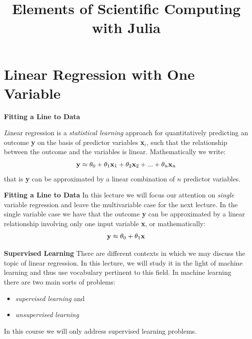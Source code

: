 \documentclass[xcolor=dvipsnames]{beamer}
\title[Scientific Computing]{Elements of Scientific Computing with Julia}
\begin{document}
\begin{frame}
\titlepage
\end{frame}

\section{Linear Regression with One Variable}
\begin{frame}
{\bf Fitting a Line to Data}

{\it\huge L}inear regression is a \emph{statistical learning} approach for quantitatively predicting an outcome {\bf y} on the basis of predictor variables {\bf x}$_i$, such that the relationship between the outcome and the variables is linear. Mathematically we write: \pause
\[
\textnormal{{\bf y}} \approx  \theta_0 +
\theta_1 \textnormal{{\bf x}}_1 +
\theta_2 \textnormal{{\bf x}}_2 + ... +
\theta_n \textnormal{{\bf x}}_n
\]
\pause
that is {\bf y} can be approximated by a linear combination of $n$ predictor variables.\\
\end{frame}

\begin{frame}
{\bf Fitting a Line to Data}
In this lecture we will focus our attention on \emph{single} variable regression and leave the multivariable case for the next lecture. In the single variable case we have that the outcome {\bf y} can be approximated by a linear relationship involving only one input variable {\bf x}, or mathematically: \pause
\[
\textnormal{{\bf y}} \approx  \theta_0 +
\theta_1 \textnormal{{\bf x}}
\]
\end{frame}

\begin{frame}
{\bf Supervised Learning}
There are different contexts in which we may discuss the topic of linear regression. In this lecture, we will study it in the light of machine learning and thus use vocabulary pertinent to this field. \vfill \pause In machine learning there are two main sorts of problems:\pause
\begin{itemize}
\item \emph{supervised learning} and 
\item \emph{unsupervised learning}
\end{itemize}
\vfill \pause In this course we will only address supervised learning problems. \\
\end{frame}
\end{document}
